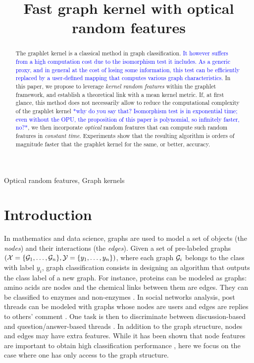 \documentclass{article}
\title{Fast graph kernel with optical random features}
\newcommand\nt[1]{\textcolor{blue}{#1}}
\begin{document}
%
\newtheorem{theorem}{Theorem} 
\maketitle
%
\begin{abstract}
The graphlet kernel is a classical method in graph classification. \nt{It however suffers from a high computation cost due to the isomorphism test it includes. As a generic proxy, and in general at the cost of losing some information, this test can be efficiently replaced by a user-defined mapping that computes various graph characteristics.} In this paper, we propose to leverage \emph{kernel random features} within the graphlet framework, and establish a theoretical link with a mean kernel metric. If, at first glance, this method does not necessarily allow to reduce the computational complexity of the graphlet kernel \nt{*why do you say that? Isomorphism test is in exponential time; even without the OPU, the proposition of this paper is polynomial, so infinitely faster, no?*}, we then incorporate \emph{optical} random features that can compute such random features in \emph{constant time}. Experiments show that the resulting algorithm is orders of magnitude faster that the graphlet kernel for the same, or better, accuracy.
\end{abstract}
%
\begin{keywords}
Optical random features, Graph kernels
\end{keywords}
%
\section{Introduction}
\label{sec:intro}
In mathematics and data science, graphs are used to model a set of objects (the \emph{nodes}) and their interactions (the \emph{edges}). %
Given a set of pre-labeled graphs $(\mathcal{X}=\{\mathcal{G}_1,\ldots,\mathcal{G}_n\}, \mathcal{Y}=\{y_1,\ldots,y_n\})$, where each graph $\mathcal{G}_i$ belongs to the class with label $y_i$, graph classification consists in designing an algorithm that outputs the class label of a new graph.
%
For instance, proteins can be modeled as graphs: amino acids are nodes and the chemical links between them are edges. They can be classified to enzymes and non-enzymes \cite{protein_application}.
%
In social networks analysis, post threads can be modeled with graphs whose nodes are users and edges are replies to others' comment \cite{graph_soc_net}. One task is then to discriminate between discussion-based and question/answer-based threads \cite{class_Reddit}.
%
In addition to the graph structure, nodes and edges may have extra features. While it has been shown that node features are important to obtain high classification performance \cite{node_features}, here we focus on the case where one has only access to the graph structure.%
\end{document}
